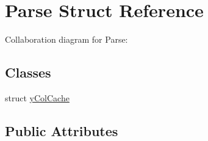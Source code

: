 \hypertarget{struct_parse}{\section{Parse Struct Reference}
\label{struct_parse}
}


Collaboration diagram for Parse\+:
\subsection*{Classes}
\begin{DoxyCompactItemize}
\item 
struct \hyperlink{struct_parse_1_1y_col_cache}{y\+Col\+Cache}
\end{DoxyCompactItemize}
\subsection*{Public Attributes}
